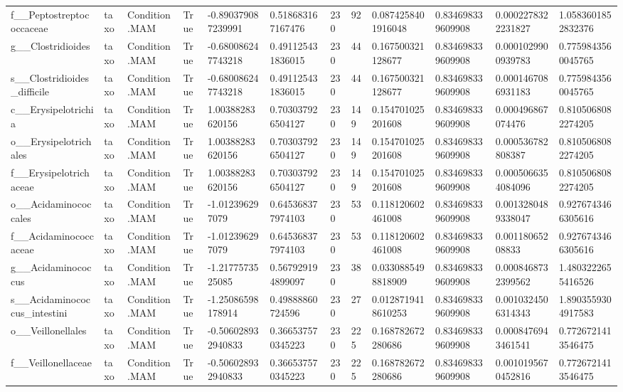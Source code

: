 \begin{longtable}{llllllllllll}
f\_\_Peptostreptococcaceae & taxo & Condition.MAM & True & -0.890379087239991 & 0.518683167167476 & 230 & 92 & 0.0874258401916048 & 0.834698339609908 & 0.0002278322231827 & 1.0583601852832376 \\
g\_\_Clostridioides & taxo & Condition.MAM & True & -0.680086247743218 & 0.491125431836015 & 230 & 44 & 0.167500321128677 & 0.834698339609908 & 0.0001029900939783 & 0.7759843560045765 \\
s\_\_Clostridioides\_difficile & taxo & Condition.MAM & True & -0.680086247743218 & 0.491125431836015 & 230 & 44 & 0.167500321128677 & 0.834698339609908 & 0.0001467086931183 & 0.7759843560045765 \\
c\_\_Erysipelotrichia & taxo & Condition.MAM & True & 1.00388283620156 & 0.703037926504127 & 230 & 149 & 0.154701025201608 & 0.834698339609908 & 0.000496867074476 & 0.8105068082274205 \\
o\_\_Erysipelotrichales & taxo & Condition.MAM & True & 1.00388283620156 & 0.703037926504127 & 230 & 149 & 0.154701025201608 & 0.834698339609908 & 0.000536782808387 & 0.8105068082274205 \\
f\_\_Erysipelotrichaceae & taxo & Condition.MAM & True & 1.00388283620156 & 0.703037926504127 & 230 & 149 & 0.154701025201608 & 0.834698339609908 & 0.0005066354084096 & 0.8105068082274205 \\
o\_\_Acidaminococcales & taxo & Condition.MAM & True & -1.012396297079 & 0.645368377974103 & 230 & 53 & 0.118120602461008 & 0.834698339609908 & 0.0013280489338047 & 0.9276743466305616 \\
f\_\_Acidaminococcaceae & taxo & Condition.MAM & True & -1.012396297079 & 0.645368377974103 & 230 & 53 & 0.118120602461008 & 0.834698339609908 & 0.00118065208833 & 0.9276743466305616 \\
g\_\_Acidaminococcus & taxo & Condition.MAM & True & -1.2177573525085 & 0.567929194899097 & 230 & 38 & 0.0330885498818909 & 0.834698339609908 & 0.0008468732399562 & 1.4803222655416526 \\
s\_\_Acidaminococcus\_intestini & taxo & Condition.MAM & True & -1.25086598178914 & 0.49888860724596 & 230 & 27 & 0.0128719418610253 & 0.834698339609908 & 0.0010324506314343 & 1.8903559304917583 \\
o\_\_Veillonellales & taxo & Condition.MAM & True & -0.506028932940833 & 0.366537570345223 & 230 & 225 & 0.168782672280686 & 0.834698339609908 & 0.0008476943461541 & 0.7726721413546475 \\
f\_\_Veillonellaceae & taxo & Condition.MAM & True & -0.506028932940833 & 0.366537570345223 & 230 & 225 & 0.168782672280686 & 0.834698339609908 & 0.0010195670452816 & 0.7726721413546475 \\

\end{longtable}
